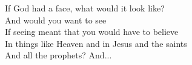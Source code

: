 If God had a face, what would it look like? \\
And would you want to see \\
If seeing meant that you would have to believe \\
In things like Heaven and in Jesus and the saints \\
And all the prophets? And...
